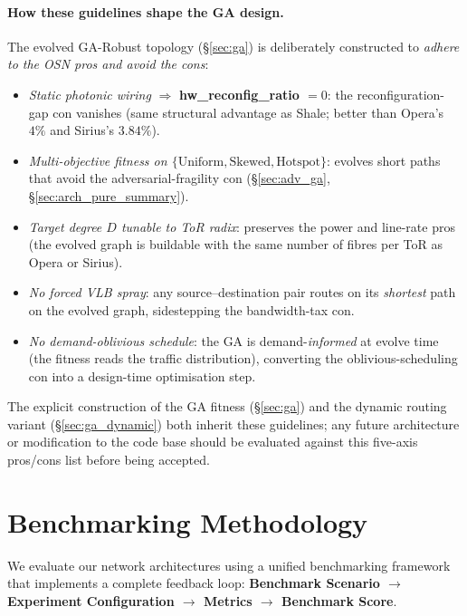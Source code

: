 \documentclass{article}
\begin{document}
    \paragraph{How these guidelines shape the GA design.}
    The evolved GA-Robust topology (\S\ref{sec:ga}) is deliberately constructed to \emph{adhere to the OSN pros and avoid the cons}:
    \begin{itemize}
        \item \emph{Static photonic wiring} $\Rightarrow$ \textbf{hw\_reconfig\_ratio $=0$}: the reconfiguration-gap con vanishes (same structural advantage as Shale; better than Opera's $4\%$ and Sirius's $3.84\%$).
        \item \emph{Multi-objective fitness on $\{\text{Uniform}, \text{Skewed}, \text{Hotspot}\}$}: evolves short paths that avoid the adversarial-fragility con (\S\ref{sec:adv_ga}, \S\ref{sec:arch_pure_summary}).
        \item \emph{Target degree $D$ tunable to ToR radix}: preserves the power and line-rate pros (the evolved graph is buildable with the same number of fibres per ToR as Opera or Sirius).
        \item \emph{No forced VLB spray}: any source--destination pair routes on its \emph{shortest} path on the evolved graph, sidestepping the bandwidth-tax con.
        \item \emph{No demand-oblivious schedule}: the GA is demand-\emph{informed} at evolve time (the fitness reads the traffic distribution), converting the oblivious-scheduling con into a design-time optimisation step.
    \end{itemize}
    The explicit construction of the GA fitness (\S\ref{sec:ga}) and the dynamic routing variant (\S\ref{sec:ga_dynamic}) both inherit these guidelines; any future architecture or modification to the code base should be evaluated against this five-axis pros/cons list before being accepted.

    \section{Benchmarking Methodology}
    We evaluate our network architectures using a unified benchmarking framework that implements a complete feedback loop: \textbf{Benchmark Scenario $\to$ Experiment Configuration $\to$ Metrics $\to$ Benchmark Score}.
\end{document}

